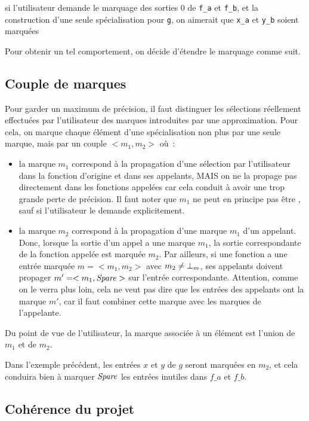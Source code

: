 si l'utilisateur demande le marquage 
des sorties 0 de \verb$f_a$ et \verb$f_b$, et la construction d'une seule
spécialisation pour \verb$g$, on aimerait que \verb$x_a$ et \verb$y_b$ soient
marquées \spare{}


\bb
Pour obtenir un tel comportement, on décide d'étendre le marquage
comme suit.

\subsection{Couple de marques}

Pour garder un maximum de précision, il faut distinguer les sélections
réellement effectuées par l'utilisateur des marques introduites par une
approximation.
Pour cela, on marque chaque élément d'une spécialisation non plus par une seule
marque, mais par un couple $<m_1, m_2>$ où~:
\begin{itemize}
  \item la marque $m_1$ correspond à la propagation d'une sélection par
    l'utilisateur dans la fonction d'origine et dans ses appelants,
    {\sc MAIS}
    on ne la propage pas directement dans les fonctions appelées
    car cela conduit à avoir une trop grande perte de précision.
    Il faut noter que $m_1$ ne peut en principe pas être \spare,
    sauf si l'utilisateur le demande explicitement.
  \item la marque $m_2$ correspond à la propagation d'une marque $m_1$
    d'un appelant. Donc, lorsque la sortie d'un appel a une marque $m_1$, la
    sortie correspondante de la fonction appelée est marquée $m_2$. 
    Par ailleurs, si une fonction a une entrée marquée 
    $m = <m_1, m_2>$ avec $m_2 \neq {\bot}_m$, ses appelants doivent propager 
    $m' = <m_1, \mathit{Spare}>$ sur l'entrée correspondante.
    Attention, comme on le verra plus loin,
    cela ne veut pas dire que les entrées des appelants ont la
    marque $m'$, car il faut combiner cette marque avec les marques de
    l'appelante.
\end{itemize}
\bb

Du point de vue de l'utilisateur, la marque associée à un élément est l'union de
$m_1$ et de $m_2$.
\bb

Dans l'exemple précédent, les entrées $x$ et $y$ de $g$
seront marquées en $m_2$, et cela conduira bien à marquer $\mathit{Spare}{}$ les entrées
inutiles dans $f\_a$ et $f\_b$.

\subsection{Cohérence du projet} \label{sec-coherence}

